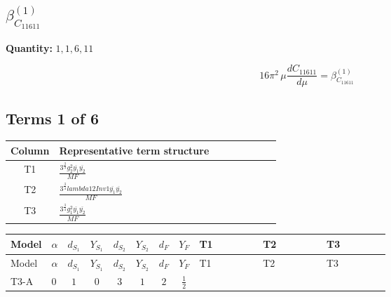 \documentclass[8pt]{article}
\begin{document}
\begin{landscape}
\section*{$\beta_{C_{11611}}^{(1)}$}
\noindent\textbf{Quantity: }$\mathrm{1,1,6,11}$\par\smallskip
\[16\pi^2\,\mu\frac{d C_{11611}}{d\mu}=\beta_{C_{11611}}^{(1)}\]
\subsection*{Terms 1 of 6}
\begin{center}
\begin{tabular}{@{}c >{\raggedright\arraybackslash}p{0.82\linewidth}@{}}
\toprule
Column & Representative term structure \\
\midrule
T1 & \(\displaystyle \frac{3^{\frac{3}{4}} g_{2}^{2} \overline{y_{1}} \overline{y_{2}}}{MF}\) \\
\midrule
T2 & \(\displaystyle \frac{3^{\frac{3}{4}} lambda12Inv1 \overline{y_{1}} \overline{y_{2}}}{MF}\) \\
\midrule
T3 & \(\displaystyle \frac{3^{\frac{3}{4}} g_{1}^{2} \overline{y_{1}} \overline{y_{2}}}{MF}\) \\
\midrule
\bottomrule
\end{tabular}
\end{center}
\smallskip
\tiny
\begin{longtable}{@{}llcccccc >{\raggedright\arraybackslash}p{0.21\linewidth} >{\raggedright\arraybackslash}p{0.21\linewidth} >{\raggedright\arraybackslash}p{0.21\linewidth}@{}}
\toprule
Model & $\alpha$ & $d_{S_1}$ & $Y_{S_1}$ & $d_{S_2}$ & $Y_{S_2}$ & $d_F$ & $Y_F$ & T1 & T2 & T3 \\
\midrule
\endfirsthead
\toprule
Model & $\alpha$ & $d_{S_1}$ & $Y_{S_1}$ & $d_{S_2}$ & $Y_{S_2}$ & $d_F$ & $Y_F$ & T1 & T2 & T3 \\
\midrule
\endhead
T3-A & $0$ & $1$ & $0$ & $3$ & $1$ & $2$ & $\frac{1}{2}$ & \scriptsize\adjustbox{max width=\linewidth}{$\begin{gathered} - \frac{17 \cdot 3^{\frac{3}{4}} g_{2}^{2} \overline{y_{1}} \overline{y_{2}}}{24 MF}\end{gathered}$} & \scriptsize\adjustbox{max width=\linewidth}{$\begin{gathered} - \frac{3^{\frac{3}{4}} lambda12Inv1 \overline{y_{1}} \overline{y_{2}}}{6 MF}\end{gathered}$} & \scriptsize\adjustbox{max width=\linewidth}{$\begin{gathered} - \frac{3^{\frac{3}{4}} g_{1}^{2} \overline{y_{1}} \overline{y_{2}}}{8 MF}\end{gathered}$} \\

\end{longtable}
\end{landscape}
\end{document}
